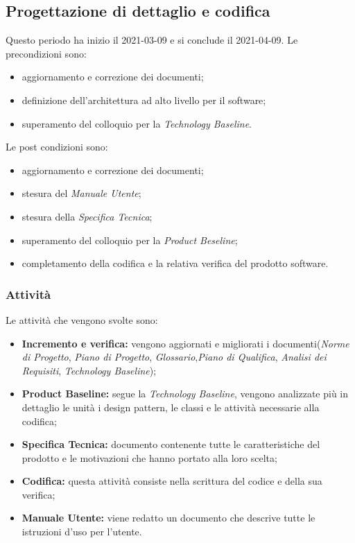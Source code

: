 \subsection{Progettazione di dettaglio e codifica}
Questo periodo ha inizio il 2021-03-09 e si conclude il 2021-04-09.
Le precondizioni sono:
\begin{itemize}
	\item aggiornamento e correzione dei documenti;
	\item definizione dell'architettura ad alto livello per il software;
	\item  superamento del colloquio per la \textit{Technology Baseline}.
\end{itemize}
Le post condizioni sono:
\begin{itemize}
	\item aggiornamento e correzione dei documenti;
	\item stesura del \textit{Manuale Utente};
	\item stesura della \textit{Specifica Tecnica};
	\item superamento del colloquio per la \textit{Product Beseline};
	\item completamento della codifica e la relativa verifica del prodotto software.
\end{itemize}
\subsubsection{Attività}
Le attività che vengono svolte sono:
\begin{itemize}
	\item \textbf{Incremento e verifica:} vengono aggiornati e migliorati i documenti(\textit{Norme di Progetto}, \textit{Piano di Progetto}, \textit{Glossario},\textit{Piano di Qualifica}, \textit{Analisi dei Requisiti}, \textit{Technology Baseline});
	\item \textbf{Product Baseline:} segue la \textit{Technology Baseline}, vengono analizzate più in dettaglio le unità i design pattern, le classi e le attività necessarie alla codifica;
	\item \textbf{Specifica Tecnica:} documento contenente tutte le caratteristiche del prodotto e le motivazioni che hanno portato alla loro scelta;
	\item \textbf{Codifica:} questa attività consiste nella scrittura del codice e della sua verifica;
	\item \textbf{Manuale Utente:} viene redatto un documento che descrive tutte le istruzioni d'uso per l'utente.
\end{itemize}
